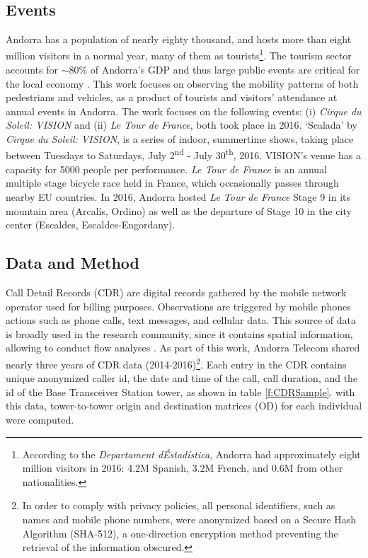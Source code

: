 {    \subsection{Events}
    {
        Andorra has a population of nearly eighty thousand, and hosts more than eight million visitors in a normal year, many of them as tourists\footnote{According to the \textit{Departament d\'Estad\'istica}, Andorra had approximately eight million visitors in 2016: 4.2M Spanish, 3.2M French, and 0.6M from other nationalities.}. The tourism sector accounts for $\sim$80\% of Andorra's GDP and thus large public events are critical for the local economy \cite{CIA}. This work focuses on observing the mobility patterns of both pedestrians and vehicles, as a product of tourists and visitors' attendance at annual events in Andorra. The work focuses on the following events: (i) \textit{Cirque du Soleil: VISION} and (ii) \textit{Le Tour de France}, both took place in 2016.
        \newline
        `Scalada' by \textit{Cirque du Soleil: VISION}, is a series of indoor, summertime shows, taking place between Tuesdays to Saturdays, July 2\textsuperscript{nd} - July 30\textsuperscript{th}, 2016. VISION's venue has a capacity for 5000 people per performance. \textit{Le Tour de France} is an annual multiple stage bicycle race held in France, which occasionally passes through nearby EU countries. In 2016, Andorra hosted \textit{Le Tour de France} Stage 9 in its mountain area (Arcal\'is, Ordino) as well as the departure of Stage 10 in the city center (Escaldes, Escaldes-Engordany).
    }

    \subsection{Data and Method}
    {
        Call Detail Records (CDR) are digital records gathered by the mobile network operator used for billing purposes. Observations are triggered by mobile phones actions such as phone calls, text messages, and cellular data. This source of data is broadly used in the research community, since it contains spatial information, allowing to conduct flow analyses \cite{Blondel2015, ccolak2015analyzing, Ratti2006}. As part of this work, Andorra Telecom shared nearly three years of CDR data (2014-2016)\footnote{In order to comply with privacy policies, all personal identifiers, such as names and mobile phone numbers, were anonymized based on a Secure Hash Algorithm (SHA-512), a one-direction encryption method preventing the retrieval of the information obscured.}. Each entry in the CDR contains unique anonymized caller id, the date and time of the call, call duration, and the id of the Base Transceiver Station tower, as shown in table \eqref{f:CDRSample}. with this data, tower-to-tower origin and destination matrices (OD) for each individual were computed.


}}
